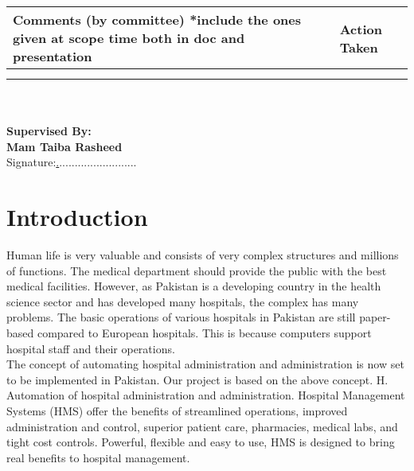 \documentclass{article}
\begin{document}
\begin{tabularx}{0.8\textwidth} { 
  | >{\raggedright\arraybackslash}X  
  | >{\raggedleft\arraybackslash}X |}
 \hline
 Comments (by committee)
*include the ones given at scope time both in doc and presentation
 & Action Taken  \\
 \hline
   &   &    \\
\hline
  &   &     \\
\hline
\end{tabularx}
\\ \hfill \break \hfill \break \hfill \break \hfill \break \hfill \break \hfill \break \hfill \break
\\
{\bfseries\Large Supervised By:}\\ \hfill \break
    {\bfseries\Large Mam Taiba Rasheed}\\ \hfill \break \hfill \break \hfill \break \hfill \break
    {Signature:\underline ..........................}
    
\newpage
\section{Introduction}
Human life is very valuable and consists of very complex structures and millions of functions. The medical department should provide the public with the best medical facilities. However, as Pakistan is a developing country in the health science sector and has developed many hospitals, the complex has many problems. The basic operations of various hospitals in Pakistan are still paper-based compared to European hospitals. This is because computers support hospital staff and their operations.\\
The concept of automating hospital administration and administration is now set to be implemented in Pakistan. Our project is based on the above concept. H. Automation of hospital administration and administration. Hospital Management Systems (HMS) offer the benefits of streamlined operations, improved administration and control, superior patient care, pharmacies, medical labs, and tight cost controls. Powerful, flexible and easy to use, HMS is designed to bring real benefits to hospital management.
\newpage
\end{document}
